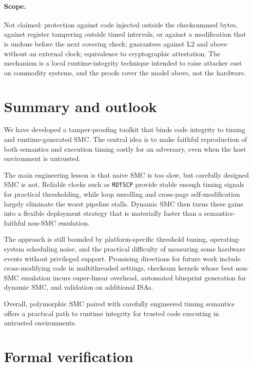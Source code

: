 \documentclass[11pt]{article}
\begin{document}
\paragraph{Scope.}
Not claimed: protection against code injected outside the checksummed bytes, against register tampering outside timed intervals, or against a modification that is undone before the next covering check; guarantees against L2 and above without an external clock; equivalence to cryptographic attestation.
The mechanism is a local runtime-integrity technique intended to raise attacker cost on commodity systems, and the proofs cover the model above, not the hardware.

\section{Summary and outlook}\label{sec:summary}

We have developed a tamper-proofing toolkit that binds code integrity to timing
and runtime-generated SMC.  The central idea is to make faithful reproduction of
both semantics and execution timing costly for an adversary, even when the host
environment is untrusted.

The main engineering lesson is that naive SMC is too slow, but carefully designed
SMC is not.  Reliable clocks such as \texttt{RDTSCP} provide stable enough timing
signals for practical thresholding, while loop unrolling and cross-page
self-modification largely eliminate the worst pipeline stalls.  Dynamic SMC then
turns these gains into a flexible deployment strategy that is materially faster
than a semantics-faithful non-SMC emulation.

The approach is still bounded by platform-specific threshold tuning, operating-
system scheduling noise, and the practical difficulty of measuring some hardware
events without privileged support.  Promising directions for future work include
cross-modifying code in multithreaded settings, checksum kernels whose best
non-SMC emulation incurs super-linear overhead, automated blueprint generation for
dynamic SMC, and validation on additional ISAs.

Overall, polymorphic SMC paired with carefully engineered timing semantics offers
a practical path to runtime integrity for trusted code executing in untrusted
environments.

\section{Formal verification}\label{sec:formal}
\end{document}
